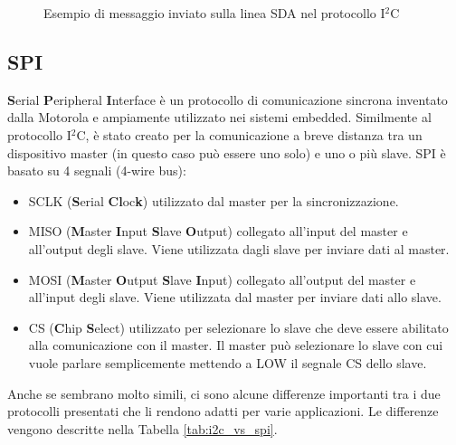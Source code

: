\documentclass[12pt]{report}
\begin{document}
\begin{figure}
	\caption{Esempio di messaggio inviato sulla linea SDA nel protocollo I$^2$C }
	\label{fig:i2c_data_bus}
\end{figure}


%
\subsection{SPI}\label{sec:spi}
% 

\textbf{S}erial \textbf{P}eripheral \textbf{I}nterface è un protocollo di comunicazione sincrona inventato dalla Motorola e ampiamente utilizzato nei sistemi embedded. Similmente al protocollo I$^2$C, è stato creato per la comunicazione a breve distanza tra un dispositivo master (in questo caso può essere uno solo) e uno o più slave.
SPI è basato su 4 segnali (4-wire bus):

\begin{itemize}
	\item SCLK (\textbf{S}erial \textbf{Cl}oc\textbf{k}) utilizzato dal master per la sincronizzazione.
	\item MISO (\textbf{M}aster \textbf{I}nput \textbf{S}lave \textbf{O}utput) collegato all'input del master e all'output degli slave. Viene utilizzata dagli slave per inviare dati al master.
	\item MOSI (\textbf{M}aster \textbf{O}utput \textbf{S}lave \textbf{I}nput) collegato all'output del master e all'input degli slave. Viene utilizzata dal master per inviare dati allo slave.
	\item CS (\textbf{C}hip \textbf{S}elect) utilizzato per selezionare lo slave che deve essere abilitato alla comunicazione con il master. Il master può selezionare lo slave con cui vuole parlare semplicemente mettendo a LOW il segnale CS dello slave.
\end{itemize}
Anche se sembrano molto simili, ci sono alcune differenze importanti tra i due protocolli presentati che li rendono adatti per varie applicazioni. Le differenze vengono descritte nella Tabella \ref{tab:i2c_vs_spi}.
\end{document}
